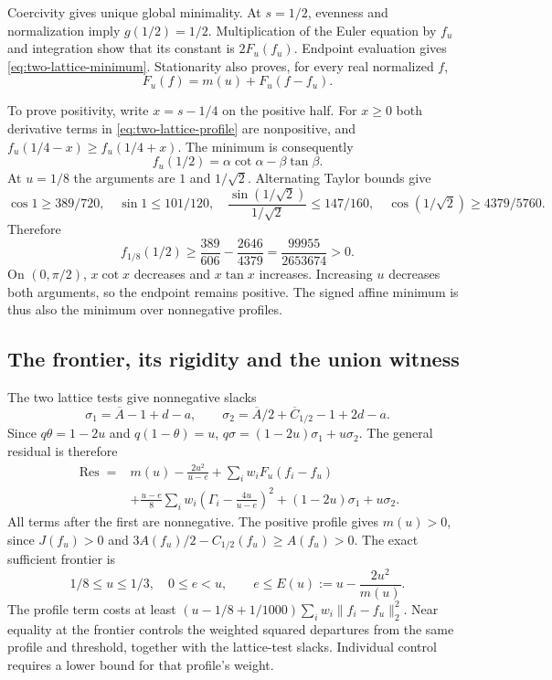\documentclass[11pt,reqno]{amsart}
\numberwithin{equation}{section}
\begin{document}
Coercivity gives unique global minimality. At $s=1/2$,
evenness and normalization imply $g(1/2)=1/2$.
Multiplication of the Euler equation by $f_u$ and integration
show that its constant is $2F_u(f_u)$.
Endpoint evaluation gives \eqref{eq:two-lattice-minimum}.
Stationarity also proves, for every real normalized $f$,
\begin{equation}
 F_u(f)=m(u)+F_u(f-f_u).
 \label{eq:two-lattice-exact-defect}
\end{equation}

To prove positivity, write $x=s-1/4$ on the positive half.
For $x\ge0$ both derivative terms in
\eqref{eq:two-lattice-profile} are nonpositive, and
$f_u(1/4-x)\ge f_u(1/4+x)$. The minimum is consequently
\[
 f_u(1/2)=\alpha\cot\alpha-\beta\tan\beta.
\]
At $u=1/8$ the arguments are $1$ and $1/\sqrt2$.
Alternating Taylor bounds give
\[
 \cos1\ge389/720,\quad \sin1\le101/120,\quad
 \frac{\sin(1/\sqrt2)}{1/\sqrt2}\le147/160,\quad
 \cos(1/\sqrt2)\ge4379/5760.
\]
Therefore
\[
 f_{1/8}(1/2)\ge
 \frac{389}{606}-\frac{2646}{4379}
 =\frac{99955}{2653674}>0.
\]
On $(0,\pi/2)$, $x\cot x$ decreases and $x\tan x$ increases.
Increasing $u$ decreases both arguments, so the endpoint
remains positive. The signed affine minimum is thus also the
minimum over nonnegative profiles.

\subsection{The frontier, its rigidity and the union witness}

The two lattice tests give nonnegative slacks
\[
 \sigma_1=\overline A-1+d-a,\qquad
 \sigma_2=\overline A/2+\overline C_{1/2}-1+2d-a.
\]
Since $q\theta=1-2u$ and $q(1-\theta)=u$,
$q\sigma=(1-2u)\sigma_1+u\sigma_2$.
The general residual is therefore
\begin{equation}
 \begin{split}
 \operatorname{Res}={}&m(u)-\frac{2u^2}{u-e}
       +\sum_iw_iF_u(f_i-f_u)\\
 &+\frac{u-e}{8}\sum_iw_i
       \left(\Gamma_i-\frac{4u}{u-e}\right)^2
       +(1-2u)\sigma_1+u\sigma_2.
 \end{split}
 \label{eq:two-lattice-frontier-residual}
\end{equation}
All terms after the first are nonnegative.
The positive profile gives $m(u)>0$, since $J(f_u)>0$ and
$3A(f_u)/2-C_{1/2}(f_u)\ge A(f_u)>0$.
The exact sufficient frontier is
\begin{equation}
 1/8\le u\le1/3,\quad0\le e<u,\qquad
 e\le E(u):=u-\frac{2u^2}{m(u)}.
 \label{eq:two-count-frontier}
\end{equation}
The profile term costs at least
$(u-1/8+1/1000)\sum_iw_i\|f_i-f_u\|_2^2$.
Near equality at the frontier controls the weighted squared departures
from the same profile and threshold, together with the lattice-test
slacks. Individual control requires a lower bound for that profile's weight.
\end{document}
